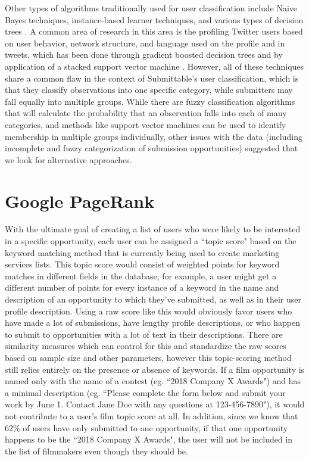 \documentclass[12pt]{report}   %
\begin{document}
Other types of algorithms traditionally used for user classification include Naive Bayes techniques, instance-based learner techniques,  and various types of decision trees \cite{cufoglu_lohi_madani_2009}. A common area of research in this area is the profiling Twitter users based on user behavior, network structure, and language used on the profile and in tweets, which has been done through gradient boosted decision trees \cite{pennacchiotti_popescu_2011} and by application of a stacked support vector machine \cite{rao_yarowsky_shreevats_gupta_2010}. However, all of these techniques share a common flaw in the context of Submittable's user classification, which is that they classify observations into one specific category, while submitters may fall equally into multiple groups. While there are fuzzy classification algorithms that will calculate the probability that an observation falls into each of many categories, and methods like support vector machines can be used to identify membership in multiple groups individually, other issues with the data (including incomplete and fuzzy categorization of submission opportunities) suggested that we look for alternative approaches.

\section{Google PageRank}

With the ultimate goal of creating a list of users who were likely to be interested in a specific opportunity, each user can be assigned a ``topic score" based on the keyword matching method that is currently being used to create marketing services lists. This topic score would consist of weighted points for keyword matches in different fields in the database; for example, a user might get a different number of points for every instance of a keyword in the name and description of an opportunity to which they've submitted, as well as in their user profile description. Using a raw score like this would obviously favor users who have made a lot of submissions, have lengthy profile descriptions, or who happen to submit to opportunities with a lot of text in their descriptions. There are similarity measures which can control for this and standardize the raw scores based on sample size and other parameters, however this topic-scoring method still relies entirely on the presence or absence of keywords. If a film opportunity is named only with the name of a contest (eg. ``2018 Company X Awards") and has a minimal description (eg. ``Please complete the form below and submit your work by June 1. Contact Jane Doe with any questions at 123-456-7890"), it would not contribute to a user's film topic score at all. In addition, since we know that 62\% of users have only submitted to one opportunity, if that one opportunity happens to be the ``2018 Company X Awards", the user will not be included in the list of filmmakers even though they should be.
\end{document}
